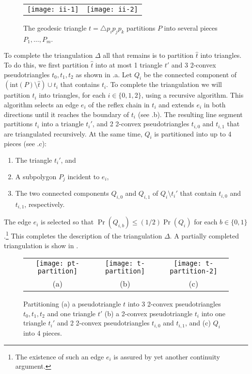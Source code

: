 \documentclass[lotsofwhite]{patmorin}
\newcommand{\interior}{\mathrm{int}}
\newcommand{\z}[1]{{\hat{#1}}}
\begin{document}
\begin{figure}
  \begin{center}
    \begin{tabular}{cc}
      \texttt{[image: ii-1]} & \texttt{[image: ii-2]} 
    \end{tabular}
  \end{center}
  \caption{The geodesic triangle $t=\triangle p_i p_j p_k$ partitions $P$ into several
pieces $P_1,\ldots,P_m$.}
\end{figure}


To complete the triangulation $\Delta$ all that remains is to
partition $\z t$ into triangles.  To do this, we first
partition $\z t$ into at most 1 triangle $t'$ and 3 2-convex
pseudotriangles $t_0,t_1,t_2$ as shown in .a. Let
$Q_i$ be the connected component of $(\interior(P)\setminus \z t)\cup t_i$ that
contains $t_i$.  To complete the triangulation we will partition
$t_i$ into triangles, for each $i\in\{0,1,2\}$, using a recursive
algorithm.  This algorithm selects an edge $e_i$ of the reflex chain
in $t_i$ and
extends $e_i$ in both directions until it reaches the boundary of $t_i$
(see .b).  The resulting line segment partitions
$t_i$ into a triangle $t_i'$, and 2 2-convex pseudotriangles $t_{i,0}$
and
$t_{i,1}$ that are triangulated recursively.  
At the same time, $Q_i$ is partitioned into up to 4 pieces
(see .c):
\begin{enumerate}
\item The triangle $t_i'$, and
\item A subpolygon $P_j$ incident to $e_i$,
\item The two connected components $Q_{i,0}$
and $Q_{i,1}$ of $Q_i\setminus t_i'$ that contain $t_{i,0}$ and
$t_{i,1}$, respectively.
\end{enumerate}
The edge $e_i$ is selected
so that $\Pr(Q_{i,b})\le (1/2)\Pr(Q_i)$ for each
$b\in\{0,1\}$.\footnote{The existence of such an edge $e_i$ is assured
by yet another continuity argument.}  This
completes the description of the triangulation $\Delta$.  A partially
completed triangulation is show in .

\begin{figure}
  \begin{center}
    \begin{tabular}{ccc}
      \texttt{[image: pt-partition]} & 
      \texttt{[image: t-partition]} &
      \texttt{[image: t-partition-2]} \\
      (a) & (b) & (c)
    \end{tabular}
  \end{center}
  \caption{Partitioning (a) a pseudotriangle $t$ into 3 2-convex
pseudotriangles $t_0,t_1,t_2$ and one triangle $t'$ (b) a 2-convex
pseudotriangle $t_i$ into one triangle $t_i'$ and 2 2-convex
pseudotriangles $t_{i,0}$ and $t_{i,1}$, and (c) $Q_i$ into 4 pieces.}
\end{figure}
\end{document}
